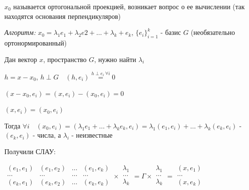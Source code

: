 \documentclass[12pt]{article}
\begin{document}
    \Nota $\displaystyle x_0$ называется ортогональной проекцией, возникает вопрос о ее вычислении (так находятся основания перпендикуляров)

    \vspace{5mm}

    \textit{Алгоритм:} $\displaystyle x_0 = \lambda_1 e_1 + \lambda_2 e2 + \dots + \lambda_k + e_k$, $\displaystyle \{e_i\}^k_{i=1}$ - базис $G$ (необязательно ортонормированный)

    Дан вектор $x$, пространство $G$, нужно найти $\displaystyle \lambda_i$

    $\displaystyle h = x - x_0$, $\displaystyle h \perp G \quad  (h, e_i) \stackrel{h \perp e_i \ \forall i}{=} 0$

    $\displaystyle (x - x_0, e_i) = (x, e_i) - (x_0, e_i) = 0$

    $\displaystyle (x, e_i) = (x_0, e_i)$

    Тогда $\displaystyle \forall i \quad (x_0, e_i) = (\lambda_1 e_1 + \dots + \lambda_k e_k, e_i) = \lambda_1 (e_1, e_i) + \dots + \lambda_k (e_k, e_i)$ - $\displaystyle (e_k, e_i)$ - числа, а $\displaystyle \lambda_i$ - неизвестные

    Получили СЛАУ:

    $\displaystyle \begin{array}{|cccc|}
    (e_1, e_1) & (e_1, e_2) & \ldots & (e_1, e_k)\\
    \ldots & \ldots & \ldots & \ldots\\
    (e_k, e_1) & (e_k, e_2) & \ldots & (e_k, e_k)\\
    \end{array} \times \begin{array}{|c|}
    \lambda_1\\
    \ldots\\
    \lambda_k \\
    \end{array} = \Gamma \times \begin{array}{|c|}
    \lambda_1\\
    \ldots\\
    \lambda_k \\
    \end{array} = \begin{array}{|c|}
    (x,e_1)\\
    \ldots\\
    (x,e_k) \\
    \end{array}$
\end{document}
